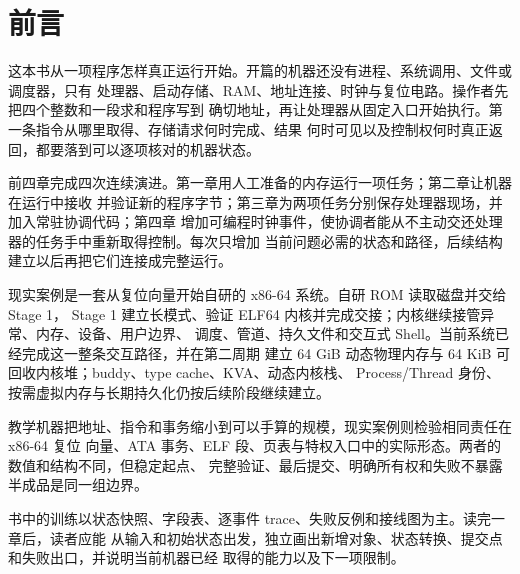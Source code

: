 \chapter*{前言}

这本书从一项程序怎样真正运行开始。开篇的机器还没有进程、系统调用、文件或调度器，只有
处理器、启动存储、RAM、地址连接、时钟与复位电路。操作者先把四个整数和一段求和程序写到
确切地址，再让处理器从固定入口开始执行。第一条指令从哪里取得、存储请求何时完成、结果
何时可见以及控制权何时真正返回，都要落到可以逐项核对的机器状态。

前四章完成四次连续演进。第一章用人工准备的内存运行一项任务；第二章让机器在运行中接收
并验证新的程序字节；第三章为两项任务分别保存处理器现场，并加入常驻协调代码；第四章
增加可编程时钟事件，使协调者能从不主动交还处理器的任务手中重新取得控制。每次只增加
当前问题必需的状态和路径，后续结构建立以后再把它们连接成完整运行。

现实案例是一套从复位向量开始自研的 x86-64 系统。自研 ROM 读取磁盘并交给 Stage 1，
Stage 1 建立长模式、验证 ELF64 内核并完成交接；内核继续接管异常、内存、设备、用户边界、
调度、管道、持久文件和交互式 Shell。当前系统已经完成这一整条交互路径，并在第二周期
建立 64 GiB 动态物理内存与 64 KiB 可回收内核堆；buddy、type cache、KVA、动态内核栈、
Process/Thread 身份、按需虚拟内存与长期持久化仍按后续阶段继续建立。

教学机器把地址、指令和事务缩小到可以手算的规模，现实案例则检验相同责任在 x86-64 复位
向量、ATA 事务、ELF 段、页表与特权入口中的实际形态。两者的数值和结构不同，但稳定起点、
完整验证、最后提交、明确所有权和失败不暴露半成品是同一组边界。

书中的训练以状态快照、字段表、逐事件 trace、失败反例和接线图为主。读完一章后，读者应能
从输入和初始状态出发，独立画出新增对象、状态转换、提交点和失败出口，并说明当前机器已经
取得的能力以及下一项限制。
